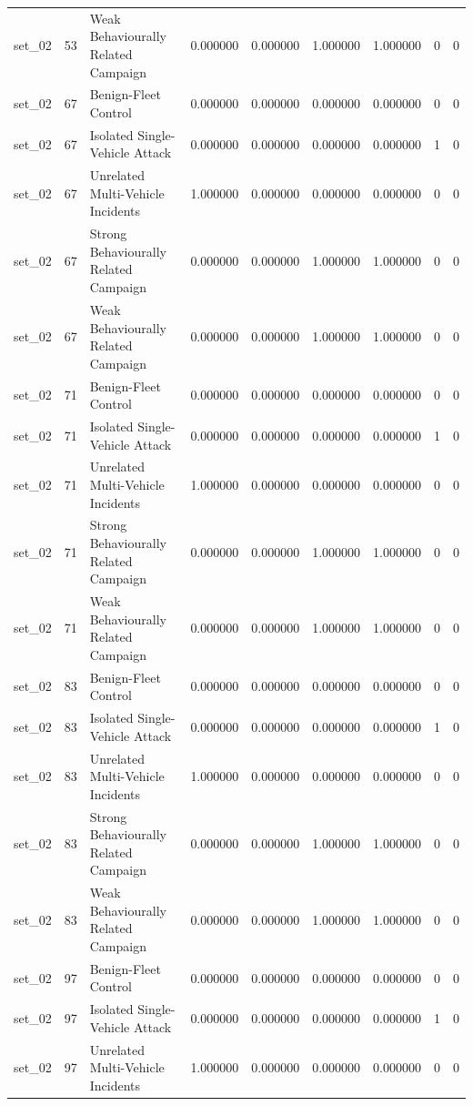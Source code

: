 \begin{tabular}{lrlrrrrrr}
set_02 & 53 & Weak Behaviourally Related Campaign & 0.000000 & 0.000000 & 1.000000 & 1.000000 & 0 & 0 \\
set_02 & 67 & Benign-Fleet Control & 0.000000 & 0.000000 & 0.000000 & 0.000000 & 0 & 0 \\
set_02 & 67 & Isolated Single-Vehicle Attack & 0.000000 & 0.000000 & 0.000000 & 0.000000 & 1 & 0 \\
set_02 & 67 & Unrelated Multi-Vehicle Incidents & 1.000000 & 0.000000 & 0.000000 & 0.000000 & 0 & 0 \\
set_02 & 67 & Strong Behaviourally Related Campaign & 0.000000 & 0.000000 & 1.000000 & 1.000000 & 0 & 0 \\
set_02 & 67 & Weak Behaviourally Related Campaign & 0.000000 & 0.000000 & 1.000000 & 1.000000 & 0 & 0 \\
set_02 & 71 & Benign-Fleet Control & 0.000000 & 0.000000 & 0.000000 & 0.000000 & 0 & 0 \\
set_02 & 71 & Isolated Single-Vehicle Attack & 0.000000 & 0.000000 & 0.000000 & 0.000000 & 1 & 0 \\
set_02 & 71 & Unrelated Multi-Vehicle Incidents & 1.000000 & 0.000000 & 0.000000 & 0.000000 & 0 & 0 \\
set_02 & 71 & Strong Behaviourally Related Campaign & 0.000000 & 0.000000 & 1.000000 & 1.000000 & 0 & 0 \\
set_02 & 71 & Weak Behaviourally Related Campaign & 0.000000 & 0.000000 & 1.000000 & 1.000000 & 0 & 0 \\
set_02 & 83 & Benign-Fleet Control & 0.000000 & 0.000000 & 0.000000 & 0.000000 & 0 & 0 \\
set_02 & 83 & Isolated Single-Vehicle Attack & 0.000000 & 0.000000 & 0.000000 & 0.000000 & 1 & 0 \\
set_02 & 83 & Unrelated Multi-Vehicle Incidents & 1.000000 & 0.000000 & 0.000000 & 0.000000 & 0 & 0 \\
set_02 & 83 & Strong Behaviourally Related Campaign & 0.000000 & 0.000000 & 1.000000 & 1.000000 & 0 & 0 \\
set_02 & 83 & Weak Behaviourally Related Campaign & 0.000000 & 0.000000 & 1.000000 & 1.000000 & 0 & 0 \\
set_02 & 97 & Benign-Fleet Control & 0.000000 & 0.000000 & 0.000000 & 0.000000 & 0 & 0 \\
set_02 & 97 & Isolated Single-Vehicle Attack & 0.000000 & 0.000000 & 0.000000 & 0.000000 & 1 & 0 \\
set_02 & 97 & Unrelated Multi-Vehicle Incidents & 1.000000 & 0.000000 & 0.000000 & 0.000000 & 0 & 0 \\

\end{tabular}
